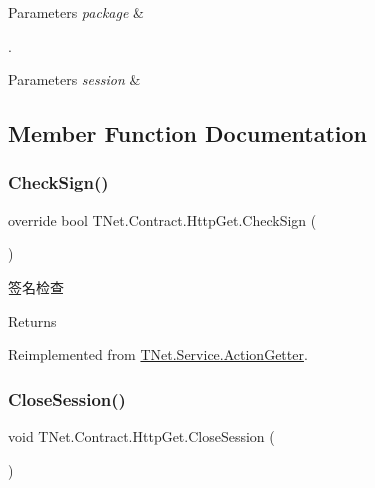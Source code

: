 \begin{DoxyParams}{Parameters}
{\em package} & \\
\hline
\end{DoxyParams}
. 
\begin{DoxyParams}{Parameters}
{\em session} & \\
\hline
\end{DoxyParams}


\subsection{Member Function Documentation}
\mbox{\label{class_t_net_1_1_contract_1_1_http_get_a7efaceab7af2c1cb106ac7ecb509bced}} 
\subsubsection{\texorpdfstring{Check\+Sign()}{CheckSign()}}
{\footnotesize\ttfamily override bool T\+Net.\+Contract.\+Http\+Get.\+Check\+Sign (\begin{DoxyParamCaption}{ }\end{DoxyParamCaption})\hspace{0.3cm}{\ttfamily [virtual]}}



签名检查 

\begin{DoxyReturn}{Returns}

\end{DoxyReturn}


Reimplemented from \mbox{\hyperlink{class_t_net_1_1_service_1_1_action_getter_afd79de3801d7a69f32ba85c62f45a774}{T\+Net.\+Service.\+Action\+Getter}}.

\mbox{\label{class_t_net_1_1_contract_1_1_http_get_af1818c08d64b78866ea0f056c43cf5b5}} 
\subsubsection{\texorpdfstring{Close\+Session()}{CloseSession()}}
{\footnotesize\ttfamily void T\+Net.\+Contract.\+Http\+Get.\+Close\+Session (\begin{DoxyParamCaption}{ }\end{DoxyParamCaption})}



